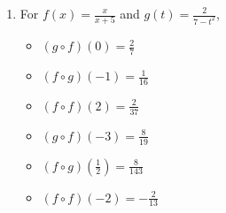 \begin{enumerate}
\begin{multicols}{3}
\begin{itemize}
\item  $(f\circ g)(-1) = 1$

\item  $(f \circ f)(2) = \frac{3}{4}$

\end{itemize}

\end{multicols}

\begin{multicols}{3}

\begin{itemize}

\item  $(g\circ f)(-3) = \frac{48}{25}$

\item  $(f\circ g)\left(\frac{1}{2}\right) = -5$

\item  $(f \circ f)(-2)$ is undefined

\end{itemize}

\end{multicols}

\item  For  $f(x) = \frac{x}{x+5}$ and $g(t) = \frac{2}{7-t^2}$,
\begin{multicols}{3}

\begin{itemize}

\item  $(g\circ f)(0) = \frac{2}{7}$

\item  $(f\circ g)(-1) = \frac{1}{16}$

\item  $(f \circ f)(2) = \frac{2}{37}$

\end{itemize}

\end{multicols}

\begin{multicols}{3}

\begin{itemize}

\item  $(g\circ f)(-3) = \frac{8}{19}$

\item  $(f\circ g)\left(\frac{1}{2}\right) = \frac{8}{143}$

\item  $(f \circ f)(-2) = -\frac{2}{13}$


\end{itemize}
\end{multicols}
\end{enumerate}
